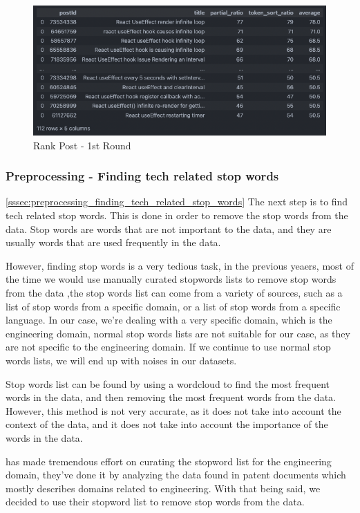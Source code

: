 \begin{figure}[H]
  \noindent \includegraphics[scale=0.65]{assets/fuzzy-wuzzy-query-1-results.png}
\caption{Rank Post - 1st Round}\label{rank_post_1st_round}
\end{figure}

\subsubsection{Preprocessing - Finding tech related stop words} \ref{sssec:preprocessing_finding_tech_related_stop_words} \label{sssec:preprocessing_finding_tech_related_stop_words}
The next step is to find tech related stop words. This is done in order to remove the stop words from the data. Stop words are words that are not important to the data, and they are usually words that are used frequently in the data. 

However, finding stop words is a very tedious task, in the previous yeaers, most of the time we would use manually curated stopwords lists to remove stop words from the data \cite{stopwords_1},the stop words list can come from a variety of sources, such as a list of stop words from a specific domain, or a list of stop words from a specific language. In our case, we're dealing with a very specific domain, which is the engineering domain, normal stop words lists are not suitable for our case, as they are not specific to the engineering domain. If we continue to use normal stop words lists, we will end up with noises in our datasets. 

Stop words list can be found by using a wordcloud to find the most frequent words in the data, and then removing the most frequent words from the data. However, this method is not very accurate, as it does not take into account the context of the data, and it does not take into account the importance of the words in the data. 

\cite{stopwords_2} has made tremendous effort on curating the stopword list for the engineering domain, they've done it by analyzing the data found in patent documents which mostly describes domains related to engineering. With that being said, we decided to use their stopword list to remove stop words from the data.

